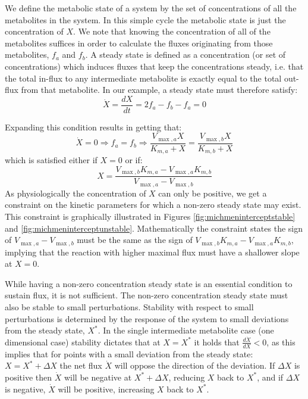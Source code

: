 \documentclass[a4page,notitlepage]{article}
\begin{document}
    We define the metabolic state of a system by the set of concentrations of all the metabolites in the system.
    In this simple cycle the metabolic state is just the concentration of $X$.
    We note that knowing the concentration of all of the metabolites suffices in order to calculate the fluxes originating from those metabolites, $f_a$ and $f_b$.
    A steady state is defined as a concentration (or set of concentrations) which induces fluxes that keep the concentrations steady, i.e. that the total in-flux to any intermediate metabolite is exactly equal to the total out-flux from that metabolite.
    In our example, a steady state must therefore satisfy:
    \begin{equation*}
      \dot X = \frac{dX}{dt} = 2f_a - f_b - f_a = 0
    \end{equation*}

    Expanding this condition results in getting that:
    \begin{equation*}
      \dot X = 0 \Rightarrow f_a = f_b \Rightarrow \frac{V_{\max,a}X}{K_{m,a}+X}=\frac{V_{\max,b}X}{K_{m,b}+X}
    \end{equation*}
    which is satisfied either if $X=0$ or if:
    \begin{equation*}
      X=\frac{V_{\max,b}K_{m,a}-V_{\max,a}K_{m,b}}{V_{\max,a}-V_{\max,b}}
    \end{equation*}
    As physiologically the concentration of $X$ can only be positive, we get a constraint on the kinetic parameters for which a non-zero steady state may exist.
    This constraint is graphically illustrated in Figures \ref{fig:michmeninterceptstable} and \ref{fig:michmeninterceptunstable}.
    Mathematically the constraint states the sign of $V_{\max,a}-V_{\max,b}$ must be the same as the sign of $V_{\max,b}K_{m,a}-V_{\max,a}K_{m,b}$, implying that the reaction with higher maximal flux must have a shallower slope at $X=0$.

    While having a non-zero concentration steady state is an essential condition to sustain flux, it is not sufficient.
    The non-zero concentration steady state must also be stable to small perturbations.
    Stability with respect to small perturbations is determined by the response of the system to small deviations from the steady state, $X^*$.
    In the single intermediate metabolite case (one dimensional case) stability dictates that at $X=X^*$ it holds that $\frac{d\dot X}{dX} <0$, as this  implies that for points with a small deviation from the steady state: $X = X^*+\Delta X$ the net flux $\dot X$ will oppose the direction of the deviation.
    If $\Delta X$ is positive then $\dot X$ will be negative at $X^*+\Delta X$, reducing $X$ back to $X^*$, and if $\Delta X$ is negative, $\dot X$ will be positive, increasing $X$ back to $X^*$.
\end{document}
